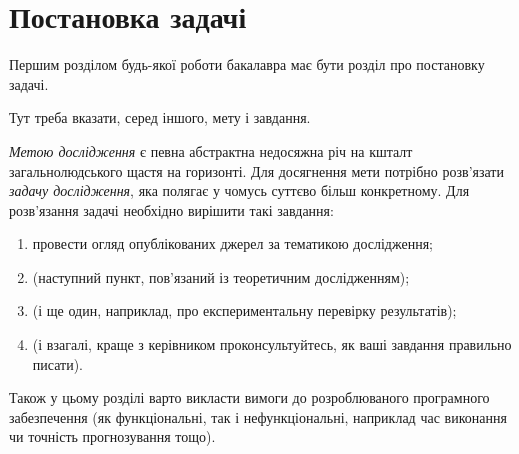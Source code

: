 
\chapter{Постановка задачі}
\label{chap:problem}  %

Першим розділом будь-якої роботи бакалавра має бути розділ про постановку задачі.

Тут треба вказати, серед іншого, мету і завдання.

\textit{Метою дослідження} є певна абстрактна недосяжна річ на кшталт 
загальнолюдського щастя на горизонті. Для досягнення мети потрібно 
розв'язати \textit{задачу дослідження}, яка полягає у чомусь суттєво більш 
конкретному. Для розв'язання задачі необхідно вирішити такі завдання:
\begin{enumerate}
	\item провести огляд опублікованих джерел за тематикою дослідження;
	\item (наступний пункт, пов'язаний із теоретичним дослідженням);
	\item (і ще один, наприклад, про експериментальну перевірку результатів);
	\item (і взагалі, краще з керівником проконсультуйтесь, як ваші 
	завдання правильно писати).
\end{enumerate}

Також у цьому розділі варто викласти вимоги до розроблюваного програмного забезпечення (як функціональні, так і нефункціональні, наприклад час виконання чи точність прогнозування тощо).